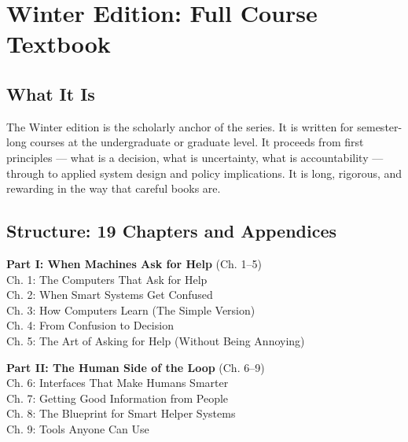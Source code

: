 \documentclass[12pt, a4paper]{article}
\begin{document}
\newpage

\section{Winter Edition: Full Course Textbook}

\begin{tcolorbox}[editionbox=textbookteal, title=Winter Edition \textbullet\ Academic Course Edition]

\subsection*{\color{charcoal} What It Is}

The Winter edition is the scholarly anchor of the series. It is written for semester-long courses at the undergraduate or graduate level. It proceeds from first principles — what is a decision, what is uncertainty, what is accountability — through to applied system design and policy implications. It is long, rigorous, and rewarding in the way that careful books are.

\subsection*{\color{charcoal} Structure: 19 Chapters and Appendices}

\begin{minipage}[t]{0.47\textwidth}
\textbf{Part I: When Machines Ask for Help} (Ch. 1--5)\\
{\small
Ch. 1: The Computers That Ask for Help\\
Ch. 2: When Smart Systems Get Confused\\
Ch. 3: How Computers Learn (The Simple Version)\\
Ch. 4: From Confusion to Decision\\
Ch. 5: The Art of Asking for Help (Without Being Annoying)\\
}

\vspace{8pt}
\textbf{Part II: The Human Side of the Loop} (Ch. 6--9)\\
{\small
Ch. 6: Interfaces That Make Humans Smarter\\
Ch. 7: Getting Good Information from People\\
Ch. 8: The Blueprint for Smart Helper Systems\\
Ch. 9: Tools Anyone Can Use\\
}


\end{minipage}
\end{tcolorbox}
\end{document}
